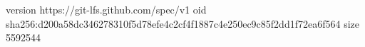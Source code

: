 version https://git-lfs.github.com/spec/v1
oid sha256:d200a58dc346278310f5d78efe4c2cf4f1887c4e250ec9c85f2dd1f72ea6f564
size 5592544
